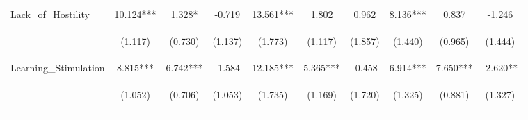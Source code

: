 \begin{tabular}{lccccccccc}
\noalign{\smallskip}Lack_of_Hostility & 10.124*** & 1.328* & -0.719 & 13.561*** & 1.802 & 0.962 & 8.136*** & 0.837 & -1.246\\
 & \begin{footnotesize}(1.117)\end{footnotesize} & \begin{footnotesize}(0.730)\end{footnotesize} & \begin{footnotesize}(1.137)\end{footnotesize} & \begin{footnotesize}(1.773)\end{footnotesize} & \begin{footnotesize}(1.117)\end{footnotesize} & \begin{footnotesize}(1.857)\end{footnotesize} & \begin{footnotesize}(1.440)\end{footnotesize} & \begin{footnotesize}(0.965)\end{footnotesize} & \begin{footnotesize}(1.444)\end{footnotesize}\\
\noalign{\smallskip}Learning_Stimulation & 8.815*** & 6.742*** & -1.584 & 12.185*** & 5.365*** & -0.458 & 6.914*** & 7.650*** & -2.620**\\
 & \begin{footnotesize}(1.052)\end{footnotesize} & \begin{footnotesize}(0.706)\end{footnotesize} & \begin{footnotesize}(1.053)\end{footnotesize} & \begin{footnotesize}(1.735)\end{footnotesize} & \begin{footnotesize}(1.169)\end{footnotesize} & \begin{footnotesize}(1.720)\end{footnotesize} & \begin{footnotesize}(1.325)\end{footnotesize} & \begin{footnotesize}(0.881)\end{footnotesize} & \begin{footnotesize}(1.327)\end{footnotesize}\\

\end{tabular}
